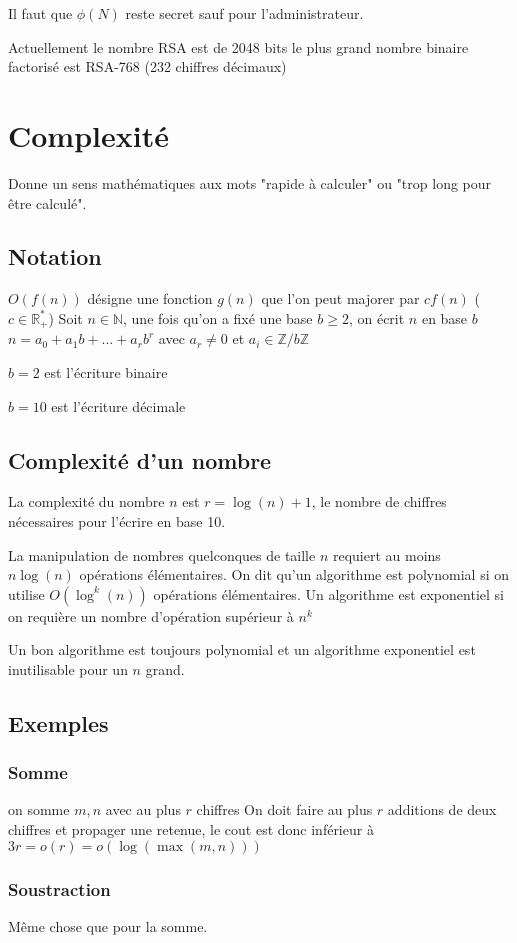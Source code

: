 \documentclass[a4paper,10pt]{book} %
\newcommand{\Rpe}{\mathbb{R}_{+}^{*}}
\newcommand{\N}{\mathbb{N}}
\newcommand{\Z}{\mathbb{Z}}
\begin{document}
Il faut que $\phi(N)$ reste secret sauf pour l'administrateur.

Actuellement le nombre RSA est de 2048 bits
le plus grand nombre binaire factorisé est RSA-768 (232 chiffres décimaux)

\section{Complexité}
Donne un sens mathématiques aux mots "rapide à calculer" ou "trop long pour être calculé".

\subsection{Notation}
$O(f(n))$ désigne une fonction $g(n)$ que l'on peut majorer par $c f(n)$ ($c\in \Rpe$)
Soit $n\in \N$, une fois qu'on a fixé une base $b\geq 2$, on écrit $n$ en base $b$
$n=a_0+a_1b+...+a_rb^r$ avec $a_r\neq 0$ et $a_i\in \Z/b\Z$

$b=2$ est l'écriture binaire

$b=10$ est l'écriture décimale

\subsection{Complexité d'un nombre}
La complexité du nombre $n$ est $r=\log(n)+1$, le nombre de chiffres nécessaires pour l'écrire en base 10.

La manipulation de nombres quelconques de taille $n$ requiert au moins $n\log(n)$ opérations élémentaires.
On dit qu'un algorithme est polynomial si on utilise $O(\log^k(n))$ opérations élémentaires.
Un algorithme est exponentiel si on requière un nombre d'opération supérieur à $n^k$

Un bon algorithme est toujours polynomial et un algorithme exponentiel est inutilisable pour un $n$ grand.

\subsection{Exemples}
\subsubsection{Somme}
on somme $m,n$ avec au plus $r$ chiffres
On doit faire au plus $r$ additions de deux chiffres et propager une retenue, le cout est donc inférieur à $3r=o(r)=o(\log(\max(m,n)))$

\subsubsection{Soustraction}
Même chose que pour la somme.
\end{document}
